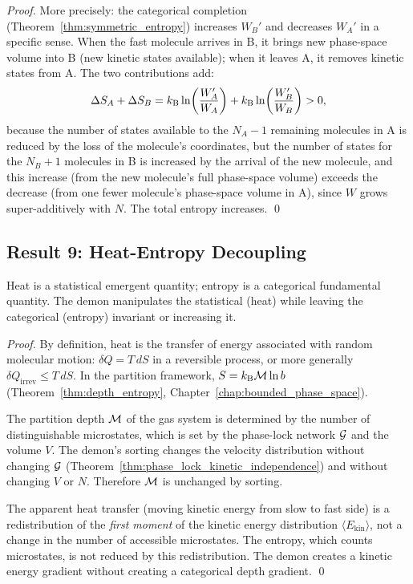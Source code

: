 \begin{proof}
More precisely: the categorical completion (Theorem~\ref{thm:symmetric_entropy})
increases $W_B'$ and decreases $W_A'$ in a specific sense. When the fast molecule
arrives in B, it brings new phase-space volume into B (new kinetic states available);
when it leaves A, it removes kinetic states from A. The two contributions add:
\begin{equation}
  \Delta S_A + \Delta S_B = k_{\mathrm{B}} \ln\!\left(\frac{W_A'}{W_A}\right) + k_{\mathrm{B}} \ln\!\left(\frac{W_B'}{W_B}\right) > 0,
\end{equation}
because the number of states available to the $N_A - 1$ remaining molecules in
A is reduced by the loss of the molecule's coordinates, but the number of states
for the $N_B + 1$ molecules in B is increased by the arrival of the new molecule,
and this increase (from the new molecule's full phase-space volume) exceeds the
decrease (from one fewer molecule's phase-space volume in A), since $W$ grows
super-additively with $N$. The total entropy increases. \qed
\end{proof}

\subsection{Result 9: Heat-Entropy Decoupling}

\begin{theorem}
\label{thm:heat_entropy_decoupling}
Heat is a statistical emergent quantity; entropy is a categorical fundamental
quantity. The demon manipulates the statistical (heat) while leaving the
categorical (entropy) invariant or increasing it.
\end{theorem}

\begin{proof}
By definition, heat is the transfer of energy associated with random molecular
motion: $\delta Q = T \, dS$ in a reversible process, or more generally
$\delta Q_{\mathrm{irrev}} \leq T \, dS$. In the partition framework,
$S = k_{\mathrm{B}} \mathcal{M} \ln b$ (Theorem~\ref{thm:depth_entropy}, Chapter~\ref{chap:bounded_phase_space}).

The partition depth $\mathcal{M}$ of the gas system is determined by the number of
distinguishable microstates, which is set by the phase-lock network $\mathcal{G}$
and the volume $V$. The demon's sorting changes the velocity distribution
without changing $\mathcal{G}$ (Theorem~\ref{thm:phase_lock_kinetic_independence})
and without changing $V$ or $N$. Therefore $\mathcal{M}$ is unchanged by sorting.

The apparent heat transfer (moving kinetic energy from slow to fast side) is
a redistribution of the \emph{first moment} of the kinetic energy distribution
$\langle E_{\mathrm{kin}} \rangle$, not a change in the number of accessible
microstates. The entropy, which counts microstates, is not reduced by this
redistribution. The demon creates a kinetic energy gradient without creating
a categorical depth gradient. \qed
\end{proof}

